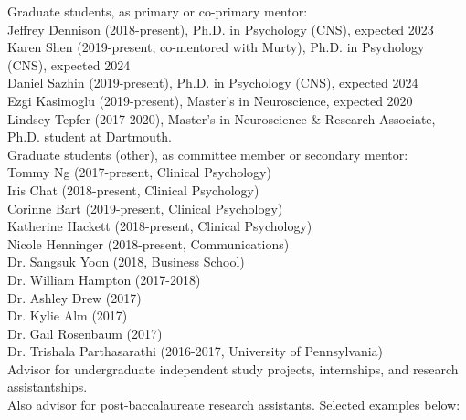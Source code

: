 \documentclass[11pt, letterpaper]{article}
\begin{document}
\begin{tabbing}
Graduate students, as primary or co-primary mentor: \\  [.1cm]
\hspace{.5in} \= Jeffrey \= Dennison (2018-present), Ph.D. in Psychology (CNS), expected 2023 \\
\> Karen Shen (2019-present, co-mentored with Murty), Ph.D. in Psychology (CNS), expected 2024 \\
\> Daniel Sazhin (2019-present), Ph.D. in Psychology (CNS), expected 2024 \\
\> Ezgi Kasimoglu (2019-present), Master's in Neuroscience, expected 2020 \\ 
\> Lindsey Tepfer (2017-2020), Master's in Neuroscience \& Research Associate, \\
\> \> Ph.D. student at Dartmouth. \\ [.2cm]

Graduate students (other), as committee member or secondary mentor: \\  [.1cm]
\> Tommy Ng (2017-present, Clinical Psychology) \\
\> Iris Chat (2018-present, Clinical Psychology) \\
\> Corinne Bart (2019-present, Clinical Psychology) \\
\> Katherine Hackett (2018-present, Clinical Psychology) \\
\> Nicole Henninger (2018-present, Communications) \\
\> Dr. Sangsuk Yoon (2018, Business School) \\
\> Dr. William Hampton (2017-2018) \\
\> Dr. Ashley Drew (2017) \\
\> Dr. Kylie Alm (2017) \\
\> Dr. Gail Rosenbaum (2017) \\
\> Dr. Trishala Parthasarathi (2016-2017, University of Pennsylvania) \\ [.2cm]

Advisor for undergraduate independent study projects, internships, and research assistantships. \\
\> Also advisor for post-baccalaureate research assistants. Selected examples below: \\  [.1cm]


\end{tabbing}
\end{document}
